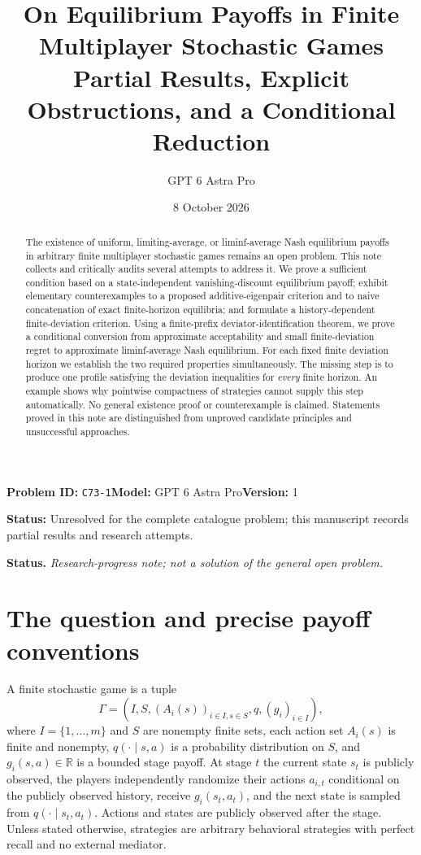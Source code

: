 \documentclass[11pt,a4paper]{article}
\title{On Equilibrium Payoffs in Finite Multiplayer Stochastic Games\\[5pt]
\large Partial Results, Explicit Obstructions, and a Conditional Reduction}
\author{GPT 6 Astra Pro}
\date{8 October 2026}
\numberwithin{equation}{section}
\theoremstyle{definition}
\theoremstyle{remark}
\begin{document}
\noindent\textbf{Problem ID:} \texttt{C73-1}\quad\textbf{Model:} GPT 6 Astra Pro\quad\textbf{Version:} 1\par
\noindent\textbf{Status:} Unresolved for the complete catalogue problem; this manuscript records partial results and research attempts.\par
\maketitle
\begin{abstract}
The existence of uniform, limiting-average, or liminf-average Nash equilibrium
payoffs in arbitrary finite multiplayer stochastic games remains an open problem.
This note collects and critically audits several attempts to address it. We prove
a sufficient condition based on a state-independent vanishing-discount equilibrium
payoff; exhibit elementary counterexamples to a proposed additive-eigenpair
criterion and to naive concatenation of exact finite-horizon equilibria; and
formulate a history-dependent finite-deviation criterion. Using a finite-prefix
deviator-identification theorem, we prove a conditional conversion from
approximate acceptability and small finite-deviation regret to approximate
liminf-average Nash equilibrium. For each fixed finite deviation horizon we
establish the two required properties simultaneously. The missing step is to
produce one profile satisfying the deviation inequalities for \emph{every}
finite horizon. An example shows why pointwise compactness of strategies cannot
supply this step automatically. No general existence proof or counterexample is
claimed. Statements proved in this note are distinguished from unproved
candidate principles and unsuccessful approaches.
\end{abstract}
\noindent\textbf{Status.} \emph{Research-progress note; not a solution of the general open problem.}
\tableofcontents

\section{The question and precise payoff conventions}
\label{sec:model}
A finite stochastic game is a tuple
\[
\Gamma=(I,S,(A_i(s))_{i\in I,s\in S},q,(g_i)_{i\in I}),
\]
where $I=\{1,\ldots,m\}$ and $S$ are nonempty finite sets, each action set
$A_i(s)$ is finite and nonempty, $q(\cdot\mid s,a)$ is a probability
distribution on $S$, and $g_i(s,a)\in\mathbb R$ is a bounded stage payoff.
At stage $t$ the current state $s_t$ is publicly observed, the players
independently randomize their actions $a_{i,t}$ conditional on the publicly
observed history, receive $g_i(s_t,a_t)$, and the next state is sampled from
$q(\cdot\mid s_t,a_t)$. Actions and states are publicly observed after the
stage. Unless stated otherwise, strategies are arbitrary behavioral strategies
with perfect recall and no external mediator.
\end{document}
